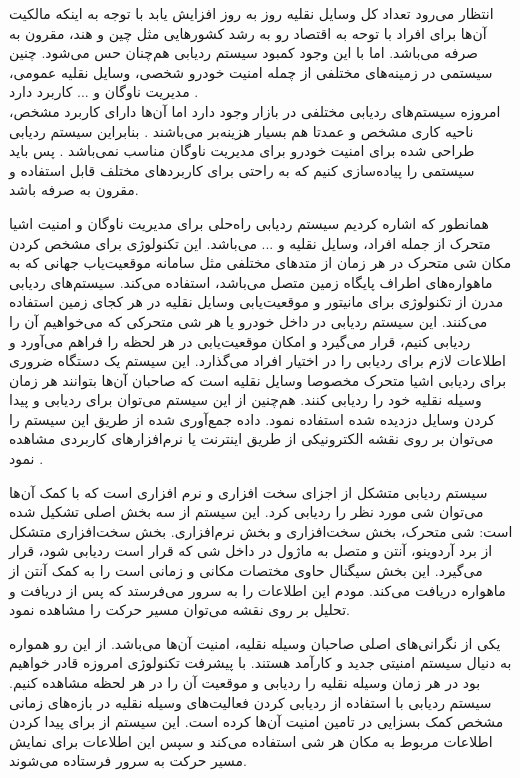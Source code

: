 انتظار می‌رود تعداد کل وسایل نقلیه روز به روز افزایش یابد با توجه به اینکه مالکیت آن‌ها برای افراد با توحه به اقتصاد رو به رشد کشورهایی مثل چین و هند، مقرون به صرفه می‌باشد. اما با این وجود کمبود سیستم ردیابی هم‌چنان حس می‌شود. چنین سیستمی در زمینه‌های مختلفی از چمله امنیت خودرو شخصی، وسایل نقلیه عمومی، مدیریت ناوگان و ... کاربرد دارد \cite{Pham2013}. \\
امروزه سیستم‌های ردیابی مختلفی در بازار وجود دارد اما آن‌ها دارای کاربرد مشخص، ناحیه کاری مشخص و عمدتا هم بسیار هزینه‌بر می‌باشند \cite{YoujingCui2003}. بنابراین سیستم ردیابی طراحی شده برای امنیت خودرو برای مدیریت ناوگان مناسب نمی‌باشد \cite{Song2008}. پس باید سیستمی را پیاده‌سازی کنیم که به راحتی برای کاربردهای مختلف قابل استفاده و مقرون به صرفه باشد.


همانطور که اشاره کردیم سیستم ردیابی راه‌حلی برای مدیریت ناوگان و امنیت اشیا متحرک از جمله افراد، وسایل نقلیه و ... می‌باشد. این تکنولوژی برای مشخص کردن مکان شی متحرک در هر زمان از متدهای مختلفی مثل سامانه موقعیت‌یاب جهانی  که به ماهواره‌های اطراف پایگاه زمین متصل می‌باشد، استفاده می‌کند. سیستم‌های ردیابی مدرن از تکنولوژی  برای مانیتور و موقعیت‌یابی وسایل نقلیه در هر کجای زمین استفاده می‌کنند. این سیستم ردیابی در داخل خودرو یا هر شی متحرکی که می‌خواهیم آن را ردیابی کنیم، قرار می‌گیرد و امکان موقعیت‌یابی در هر لحظه را فراهم می‌آورد  و اطلاعات لازم برای ردیابی را در اختیار افراد می‌گذارد. این سیستم یک دستگاه ضروری برای ردیابی اشیا متحرک مخصوصا وسایل نقلیه است که صاحبان آن‌ها بتوانند هر زمان وسیله نقلیه خود را ردیابی کنند. هم‌چنین از این سیستم می‌توان برای ردیابی و پیدا کردن وسایل دزدیده شده استفاده نمود. داده جمع‌آوری شده از طریق این سیستم را می‌توان بر روی نقشه الکترونیکی از طریق اینترنت یا نرم‌افزارهای کاربردی مشاهده نمود \cite{Agrawal2018}.


سیستم ردیابی متشکل از اجزای سخت‌ افزاری و نرم ‌افزاری است که با کمک آن‌ها می‌توان شی مورد نظر را ردیابی کرد. این سیستم از سه بخش اصلی تشکیل شده است: شی متحرک، بخش سخت‌افزاری و بخش نرم‌افزاری.
بخش سخت‌افزاری متشکل از برد آردوینو، آنتن  و  متصل به ماژول  در داخل شی که قرار است ردیابی شود، قرار می‌گیرد. این بخش سیگنال حاوی مختصات مکانی و زمانی است را به کمک آنتن  از ماهواره دریافت می‌کند. مودم  این اطلاعات را به سرور می‌فرستد که پس از دریافت و تحلیل بر روی نقشه می‌توان مسیر حرکت را مشاهده نمود.


 یکی از نگرانی‌های اصلی صاحبان وسیله نقلیه، امنیت آن‌ها می‌باشد. از این رو همواره به دنیال سیستم امنیتی جدید و کارآمد هستند. با پیشرفت تکنولوژی امروزه قادر خواهیم بود در هر زمان وسیله نقلیه را ردیابی و موقعیت آن را در هر لحظه مشاهده کنیم. سیستم ردیابی با استفاده از ردیابی  کردن فعالیت‌های وسیله نقلیه در بازه‌های زمانی مشخص کمک بسزایی در تامین امنیت آن‌ها کرده است. این سیستم از  برای پیدا کردن اطلاعات مربوط به مکان هر شی استفاده می‌کند و سپس  این اطلاعات برای نمایش مسیر حرکت به سرور فرستاده می‌شوند.
 
